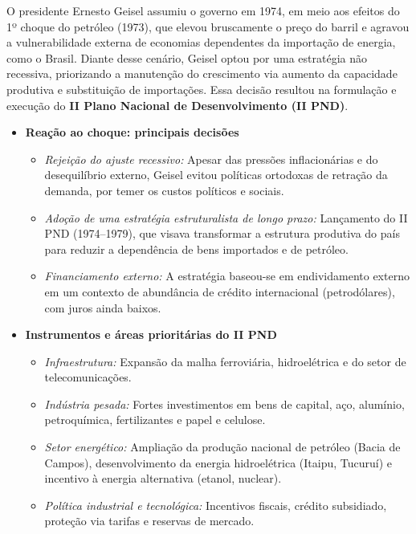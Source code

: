 \documentclass[a4paper,12pt]{article}[abntex2]
\begin{document}
O presidente Ernesto Geisel assumiu o governo em 1974, em meio aos efeitos do 1º choque do petróleo (1973), que elevou bruscamente o preço do barril e agravou a vulnerabilidade externa de economias dependentes da importação de energia, como o Brasil. Diante desse cenário, Geisel optou por uma estratégia não recessiva, priorizando a manutenção do crescimento via aumento da capacidade produtiva e substituição de importações. Essa decisão resultou na formulação e execução do \textbf{II Plano Nacional de Desenvolvimento (II PND)}.

\begin{itemize}
    \item \textbf{Reação ao choque: principais decisões}
    \begin{itemize}
        \item \textit{Rejeição do ajuste recessivo:} Apesar das pressões inflacionárias e do desequilíbrio externo, Geisel evitou políticas ortodoxas de retração da demanda, por temer os custos políticos e sociais.
        \item \textit{Adoção de uma estratégia estruturalista de longo prazo:} Lançamento do II PND (1974--1979), que visava transformar a estrutura produtiva do país para reduzir a dependência de bens importados e de petróleo.
        \item \textit{Financiamento externo:} A estratégia baseou-se em endividamento externo em um contexto de abundância de crédito internacional (petrodólares), com juros ainda baixos.
    \end{itemize}

    \item \textbf{Instrumentos e áreas prioritárias do II PND}
    \begin{itemize}
        \item \textit{Infraestrutura:} Expansão da malha ferroviária, hidroelétrica e do setor de telecomunicações.
        \item \textit{Indústria pesada:} Fortes investimentos em bens de capital, aço, alumínio, petroquímica, fertilizantes e papel e celulose.
        \item \textit{Setor energético:} Ampliação da produção nacional de petróleo (Bacia de Campos), desenvolvimento da energia hidroelétrica (Itaipu, Tucuruí) e incentivo à energia alternativa (etanol, nuclear).
        \item \textit{Política industrial e tecnológica:} Incentivos fiscais, crédito subsidiado, proteção via tarifas e reservas de mercado.
    \end{itemize}


\end{itemize}
\end{document}
